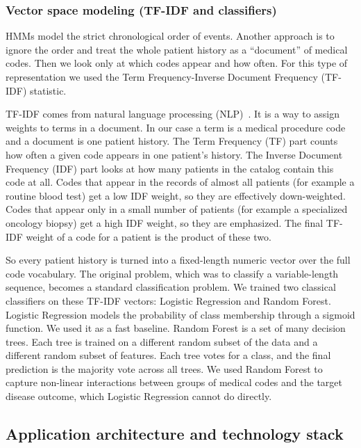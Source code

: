 \subsubsection{Vector space modeling (TF-IDF and classifiers)}
HMMs model the strict chronological order of events. Another approach is to ignore the order and treat the whole patient history as a ``document'' of medical codes. Then we look only at which codes appear and how often. For this type of representation we used the Term Frequency-Inverse Document Frequency (TF-IDF) statistic.

TF-IDF comes from natural language processing (NLP)~\cite{tfidf_icd_codes_2022}. It is a way to assign weights to terms in a document. In our case a term is a medical procedure code and a document is one patient history. The Term Frequency (TF) part counts how often a given code appears in one patient's history. The Inverse Document Frequency (IDF) part looks at how many patients in the catalog contain this code at all. Codes that appear in the records of almost all patients (for example a routine blood test) get a low IDF weight, so they are effectively down-weighted. Codes that appear only in a small number of patients (for example a specialized oncology biopsy) get a high IDF weight, so they are emphasized. The final TF-IDF weight of a code for a patient is the product of these two.

So every patient history is turned into a fixed-length numeric vector over the full code vocabulary. The original problem, which was to classify a variable-length sequence, becomes a standard classification problem. We trained two classical classifiers on these TF-IDF vectors: Logistic Regression and Random Forest. Logistic Regression models the probability of class membership through a sigmoid function. We used it as a fast baseline. Random Forest is a set of many decision trees. Each tree is trained on a different random subset of the data and a different random subset of features. Each tree votes for a class, and the final prediction is the majority vote across all trees. We used Random Forest to capture non-linear interactions between groups of medical codes and the target disease outcome, which Logistic Regression cannot do directly.


\subsection{Application architecture and technology stack}
\label{subsec:architecture}


